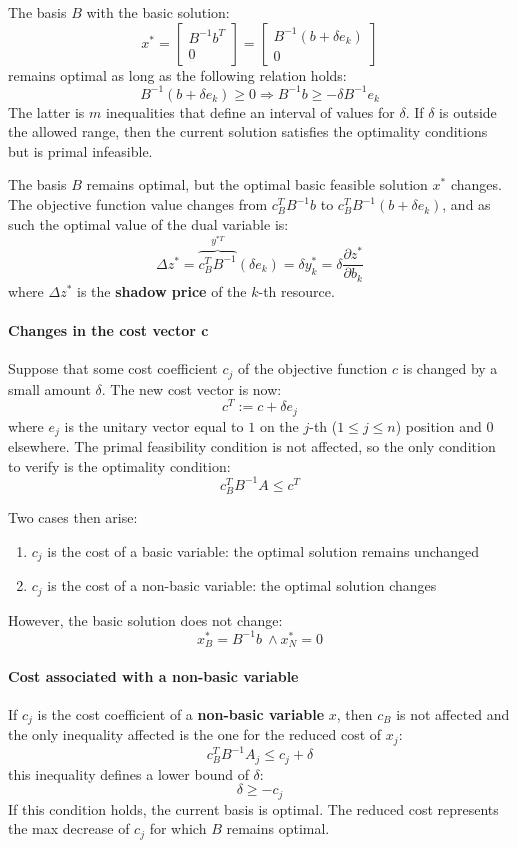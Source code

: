 The basis $B$ with the basic solution: 
\[ x^\ast = \begin{bmatrix} B^{-1} b^T \\ 0 \end{bmatrix} = \begin{bmatrix} B^{-1} \left( b + \delta e_k \right) \\ 0 \end{bmatrix} \]
remains optimal as long as the following relation holds:
\[ B^{-1} \left( b + \delta e_k \right) \geq 0 \Rightarrow B^{-1} b \geq - \delta B^{-1} e_k \]
The latter is $m$ inequalities that define an interval of values for $\delta $.
If $\delta$ is outside the allowed range, then the current solution satisfies the optimality conditions but is primal infeasible.

The basis $B$ remains optimal, but the optimal basic feasible solution $x^\ast$ changes.
The objective function value changes from $c_B^T B^{-1} b$ to $c_B^T B^{-1} \left( b + \delta e_k \right)$, and as such the optimal value of the dual variable is:
\[ \Delta z^\ast = \overbrace{c_B^T B^{-1}}^{y^{\ast T}} \left( \delta e_k \right) = \delta  y_k^\ast = \delta  \dfrac{\partial z^\ast}{\partial b_k}\]
where $\Delta z^\ast$ is the \textbf{shadow price} of the $k$-th resource.

\paragraph*{Changes in the cost vector c}
Suppose that some cost coefficient $c_j$ of the objective function $c$ is changed by a small amount $\delta$.
The new cost vector is now:
\[ c^T := c + \delta  e_j \]
where $e_j$ is the unitary vector equal to $1$ on the $j$-th ($1 \leq j \leq n$) position and $0$ elsewhere.
The primal feasibility condition is not affected, so the only condition to verify is the optimality condition:
\[ c^T_B B^{-1} A \leq c^T \]

Two cases then arise:
\begin{enumerate}
  \item $c_j$ is the cost of a basic variable: the optimal solution remains unchanged
  \item $c_j$ is the cost of a non-basic variable: the optimal solution changes
\end{enumerate}

However, the basic solution does not change:
\[ x_B^\ast = B^{-1} b \ \land x_N^\ast = 0 \]

\paragraph*{Cost associated with a non-basic variable}
If $c_j$ is the cost coefficient of a \textbf{non-basic variable} $x$, then $c_B$ is not affected and the only inequality affected is the one for the reduced cost of $x_j$:
\[ c^T_B B^{-1} A_j \leq c_j + \delta \]
this inequality defines a lower bound of $\delta$:
\[ \delta \geq - c_j \]
If this condition holds, the current basis is optimal.
The reduced cost represents the max decrease of $c_j$ for which $B$ remains optimal.

